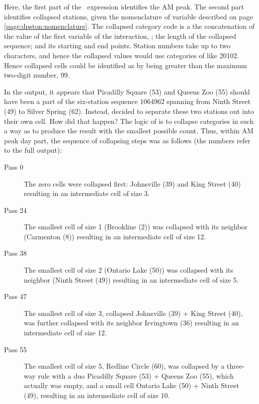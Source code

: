 Here, the first part of the \ifexp\ expression identifies
the AM peak. The second part identifies collapsed stations, given the nomenclature
of  variable described on page \ref{page:dpston:nomenclature}. 
The collapsed category code is a the concatenation
of the value of the first variable of the interaction, ; the length of the collapsed sequence;
and its starting and end points. Station numbers take up to two characters, and hence the collapsed
values would use categories of  like 20102. Hence collapsed cells 
could be identified as  by 
being greater than the maximum two-digit number, 99.

In the output, it appears that Picadilly Square (53) and Queens Zoo (55) should have been
a part of the six-station sequence 1064962 spanning from Ninth Street (49) to Silver Spring (62).
Instead,  decided to separate these two stations out into their own cell.
How did that happen? The logic of  is to collapse categories in such a way
as to produce the result with the smallest possible count. Thus, within AM peak day part,
the sequence of collapsing steps was as follows (the numbers refer to the full output):

\begin{description}
    \item[Pass 0] The zero cells were collapsed first: Johnsville (39) and King Street (40) resulting
        in an intermediate cell of size 3.
    \item[Pass 24] The smallest cell of size 1 (Brookline (2)) was collapsed with its neighbor
        (Carmenton (8)) resulting in an intermediate cell of size 12.
    \item[Pass 38] The smallest cell of size 2 (Ontario Lake (50)) was collapsed with its neighbor
        (Ninth Street (49)) resulting in an intermediate cell of size 5.
    \item[Pass 47] The smallest cell of size 3, collapsed Johnsville (39) + King Street (40),
        was further collapsed with its neighbor Irvingtown (36) resulting in an intermediate cell of size 12.
    \item[Pass 55] The smallest cell of size 5, Redline Circle (60), was collapsed by a three-way rule
        with a duo Picadilly Square (53) + Queens Zoo (55), which actually was empty, and a small cell
        Ontario Lake (50) + Ninth Street (49), resulting in an intermediate cell of size 10.
\end{description}

